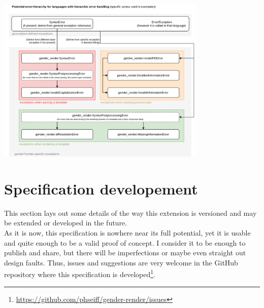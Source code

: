 \documentclass{article}
\begin{document}
    \includegraphics[width=10cm]{images/hierarchy-errors.png}\\

\section{Specification developement}

    This section lays out some details of the way this extension is versioned and may be extended or developed in the future.\\

    As it is now, this specification is nowhere near its full potential, yet it is usable and quite enough to be a valid proof of concept.
    I consider it to be enough to publish and share, but there will be imperfections or maybe even straight out design faults.
    Thus, issues and suggestions are very welcome in the GitHub repository where this specification is developed\footnote{\url{https://github.com/phseiff/gender-render/issues}}.\\
\end{document}
